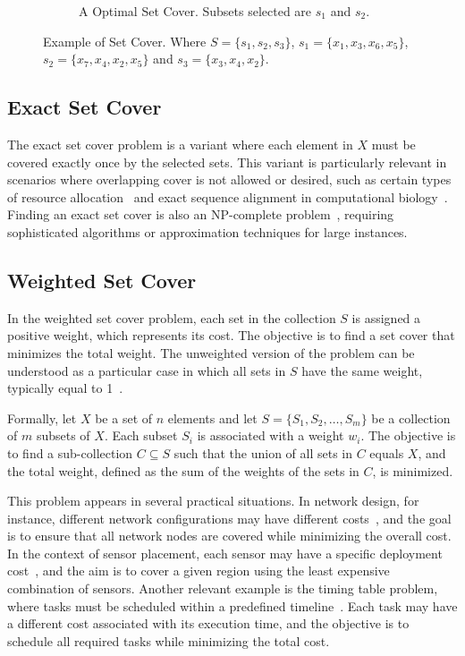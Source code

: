 \begin{figure}[!ht]
\begin{subfigure}{0.45\textwidth}
{\begin{circuitikz}
            \end{circuitikz}
            }%
            \caption{A Optimal Set Cover. Subsets selected are $s_1$ and $s_2$.} 
            \label{fig:set_cover_2}
        \end{subfigure}
        \caption[Examples of Set Cover]{Example of Set Cover. Where $S=\{s_1, s_2, s_3\}$, $s_1=\{x_1, x_3, x_6, x_5\}$, $s_2=\{x_7, x_4, x_2, x_5\}$ and $s_3=\{x_3, x_4, x_2\}$.} 
        \label{fig:set_cover}
    \end{figure}


    \subsection{Exact Set Cover}
        The exact set cover problem is a variant where each element in $X$ must be covered exactly once by the selected sets. This variant is particularly relevant in scenarios where overlapping cover is not allowed or desired, such as certain types of resource allocation~\cite{hochbaum1997approximation} and exact sequence alignment in computational biology~\cite{li2002mapping}. Finding an exact set cover is also an NP-complete problem~\cite{Karp1972}, requiring sophisticated algorithms or approximation techniques for large instances.

        \subsection{Weighted Set Cover}

            In the weighted set cover problem, each set in the collection $S$ is assigned a positive weight, which represents its cost. The objective is to find a set cover that minimizes the total weight. The unweighted version of the problem can be understood as a particular case in which all sets in $S$ have the same weight, typically equal to 1~\cite{chvatal1979greedy}.

            Formally, let $X$ be a set of $n$ elements and let $S = \{S_1, S_2, \ldots, S_m\}$ be a collection of $m$ subsets of $X$. Each subset $S_i$ is associated with a weight $w_i$. The objective is to find a sub-collection $C \subseteq S$ such that the union of all sets in $C$ equals $X$, and the total weight, defined as the sum of the weights of the sets in $C$, is minimized.

            This problem appears in several practical situations. In network design, for instance, different network configurations may have different costs~\cite{jia2002setcovering}, and the goal is to ensure that all network nodes are covered while minimizing the overall cost. In the context of sensor placement, each sensor may have a specific deployment cost~\cite{meguerdichian2001exposure}, and the aim is to cover a given region using the least expensive combination of sensors. Another relevant example is the timing table problem, where tasks must be scheduled within a predefined timeline~\cite{hochbaum1997approximation}. Each task may have a different cost associated with its execution time, and the objective is to schedule all required tasks while minimizing the total cost.

